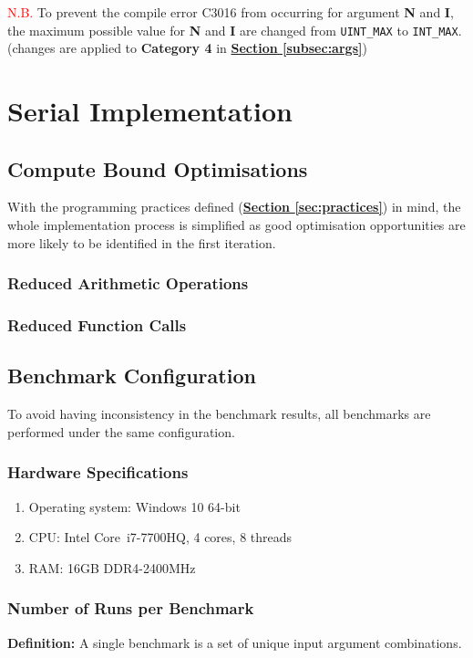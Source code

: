 \documentclass[12pt, a4paper]{article}
\begin{document}
\textcolor{red}{N.B.} To prevent the compile error C3016 from occurring for argument \textbf{N} and
\textbf{I}, the maximum possible value for \textbf{N} and \textbf{I} are changed from
\texttt{UINT_MAX} to \texttt{INT_MAX}. (changes are applied to \textbf{Category 4} in
\hyperref[subsec:args]{\textbf{Section \ref*{subsec:args}}})

\section{Serial Implementation}
\subsection{Compute Bound Optimisations}
With the programming practices defined (\hyperref[sec:practices]{\textbf{Section
\ref*{sec:practices}}}) in mind, the whole implementation process is simplified as good optimisation
opportunities are more likely to be identified in the first iteration.

\subsubsection{Reduced Arithmetic Operations}

\subsubsection{Reduced Function Calls}

\subsection{Benchmark Configuration}
To avoid having inconsistency in the benchmark results, all benchmarks are performed under the same
configuration.

\subsubsection{Hardware Specifications}
\begin{enumerate}
    \item Operating system: Windows 10 64-bit
    \item CPU: Intel\textsuperscript{\textregistered} Core\texttrademark\ i7-7700HQ, 4 cores, 8
    threads
    \item RAM: 16GB DDR4-2400MHz
\end{enumerate}

\subsubsection{Number of Runs per Benchmark}
\textbf{Definition:} A single benchmark is a set of unique input argument combinations.
\end{document}
